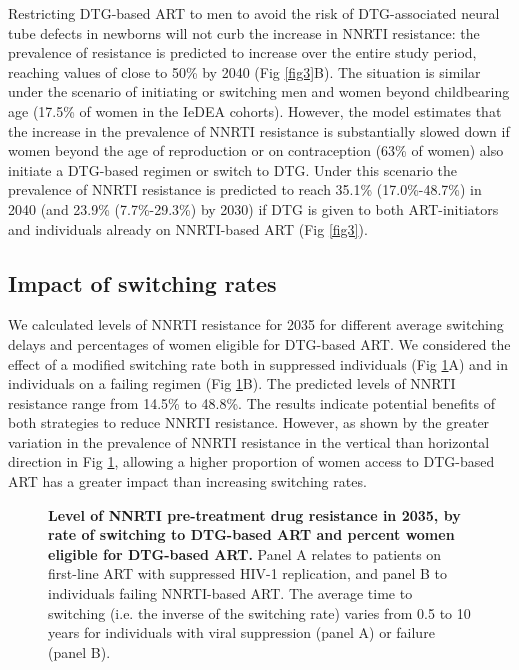 \documentclass[10pt,letterpaper]{article}
\newcommand{\numberha}{23.9\% }
\newcommand{\numberhb}{7.7\%-29.3\%}
\newcommand{\numberia}{35.1\% }
\newcommand{\numberib}{17.0\%-48.7\%}
\newcommand{\numberja}{14.5\% }
\newcommand{\numberjb}{48.8\%}
\begin{document}
Restricting DTG-based ART to men to avoid the risk of DTG-associated neural tube defects in newborns will not curb the increase in NNRTI resistance: the prevalence of resistance is predicted to increase over the entire study period, reaching values of close to 50\% by 2040 (Fig \ref{fig3}B). The situation is similar under the scenario of initiating or switching men and women beyond childbearing age (17.5\% of women in the IeDEA cohorts). However, the model estimates that the increase in the prevalence of NNRTI resistance is substantially slowed down if women beyond the age of reproduction or on contraception (63\% of women) also initiate a DTG-based regimen or switch to DTG. Under this scenario the prevalence of NNRTI resistance is predicted to reach \numberia (\numberib) in 2040 (and \numberha (\numberhb) by 2030) if DTG is given to both ART-initiators and individuals already on NNRTI-based ART (Fig \ref{fig3}).

\subsection*{Impact of switching rates}
We calculated levels of NNRTI resistance for 2035 for different average switching delays and percentages of women eligible for DTG-based ART. We considered the effect of a modified switching rate both in suppressed individuals (Fig \ref{fig4}A) and in individuals on a failing regimen (Fig \ref{fig4}B). The predicted levels of NNRTI resistance range from \numberja to \numberjb. The results indicate potential benefits of both strategies to reduce NNRTI resistance. However, as shown by the greater variation in the prevalence of NNRTI resistance in the vertical than horizontal direction in Fig \ref{fig4}, allowing a higher proportion of women access to DTG-based ART has a greater impact than increasing switching rates.

\begin{figure}[h]
   \vspace{0.5cm}
   \caption{{\bf Level of NNRTI pre-treatment drug resistance in 2035, by rate of switching to DTG-based ART and percent women eligible for DTG-based ART.}
Panel A relates to patients on first-line ART with suppressed HIV-1 replication, and panel B to individuals failing NNRTI-based ART. The average time to switching (i.e. the inverse of the switching rate) varies from 0.5 to 10 years for individuals with viral suppression (panel A) or failure (panel B).}\label{fig4}
\end{figure}
\end{document}
